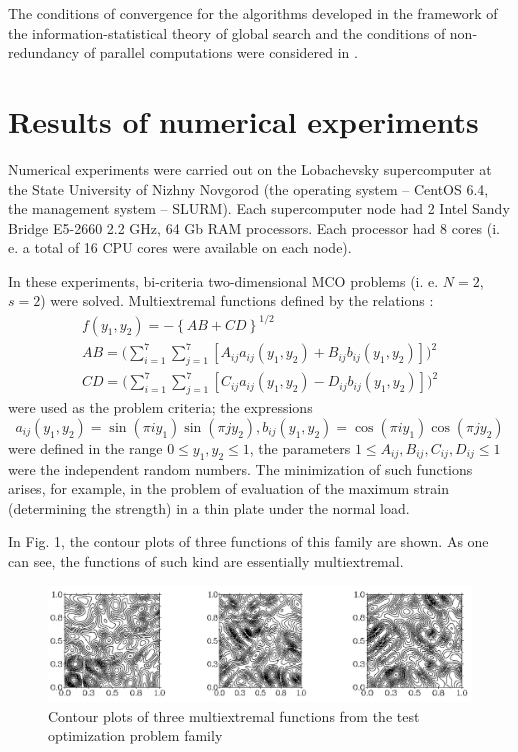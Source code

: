\documentclass[runningheads]{llncs}
\begin{document}
The conditions of convergence for the algorithms developed in the framework of the information-statistical theory of global search and the conditions of non-redundancy of parallel computations were considered in \cite{c10}. 

\section{Results of numerical experiments} \label{sec:5}

Numerical experiments were carried out on the Lobachevsky supercomputer at the State University of Nizhny Novgorod (the operating system -- CentOS 6.4, the management system -- SLURM). Each supercomputer node had 2 Intel Sandy Bridge E5-2660 2.2 GHz, 64 Gb RAM processors. Each processor had 8 cores (i. e. a total of 16 CPU cores were available on each node).

In these experiments, bi-criteria two-dimensional MCO problems (i. e. $N=2$, $s=2$) were solved. Multiextremal functions defined by the relations \cite{c10}:
\begin{equation}
\begin{split}
f(y_1, y_2) = - \left\{ AB + CD \right\}^{1/2} \\
AB = \Big(\sum_{i=1}^7 \sum_{j=1}^7 [A_{ij} a_{ij}(y_1, y_2) + B_{ij} b_{ij}(y_1, y_2)]\Big)^2 \\
CD = \Big(\sum_{i=1}^7 \sum_{j=1}^7 [C_{ij} a_{ij}(y_1, y_2) - D_{ij} b_{ij}(y_1, y_2)]\Big)^2 
\end{split}
\label{eq:20}
\end{equation}
were used as the problem criteria; the expressions 
\begin{equation}
a_{ij}(y_1, y_2) = \sin(\pi i y_1) \sin(\pi j y_2), b_{ij}(y_1, y_2) = \cos(\pi i y_1) \cos(\pi j y_2)
\end{equation}
were defined in the range $0 \leq y_1,y_2 \leq 1$, the parameters $1 \leq A_{ij},B_{ij},C_{ij},D_{ij} \leq 1$ were the independent random numbers. The minimization of such functions arises, for example, in the problem of evaluation of the maximum strain (determining the strength) in a thin plate under the normal load. 

In Fig. 1, the contour plots of three functions of this family are shown. As one can see, the functions of such kind are essentially multiextremal. 
\begin{figure}[t]
\includegraphics[width=\textwidth]{fig1}
\caption{Contour plots of three multiextremal functions from the test optimization problem family} 
\label{fig:1}
\end{figure}
\end{document}
